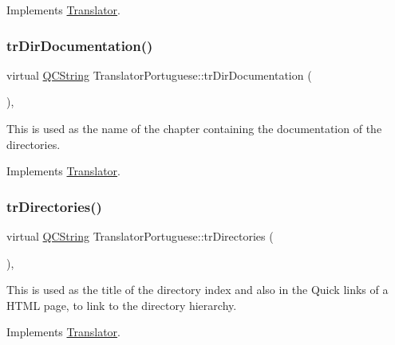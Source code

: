 Implements \mbox{\hyperlink{class_translator}{Translator}}.

\mbox{\label{class_translator_portuguese_a6442eab34e32891d047f1be6b6237b50}} 
\subsubsection{\texorpdfstring{trDirDocumentation()}{trDirDocumentation()}}
{\footnotesize\ttfamily virtual \mbox{\hyperlink{class_q_c_string}{Q\+C\+String}} Translator\+Portuguese\+::tr\+Dir\+Documentation (\begin{DoxyParamCaption}{ }\end{DoxyParamCaption})\hspace{0.3cm}{\ttfamily [inline]}, {\ttfamily [virtual]}}

This is used as the name of the chapter containing the documentation of the directories. 

Implements \mbox{\hyperlink{class_translator}{Translator}}.

\mbox{\label{class_translator_portuguese_a1d0abb2c68b2a1703056cf567877359e}} 
\subsubsection{\texorpdfstring{trDirectories()}{trDirectories()}}
{\footnotesize\ttfamily virtual \mbox{\hyperlink{class_q_c_string}{Q\+C\+String}} Translator\+Portuguese\+::tr\+Directories (\begin{DoxyParamCaption}{ }\end{DoxyParamCaption})\hspace{0.3cm}{\ttfamily [inline]}, {\ttfamily [virtual]}}

This is used as the title of the directory index and also in the Quick links of a H\+T\+ML page, to link to the directory hierarchy. 

Implements \mbox{\hyperlink{class_translator}{Translator}}.

\mbox{\label{class_translator_portuguese_aab7cba8ddd3a003584bdd079877c314a}} 
